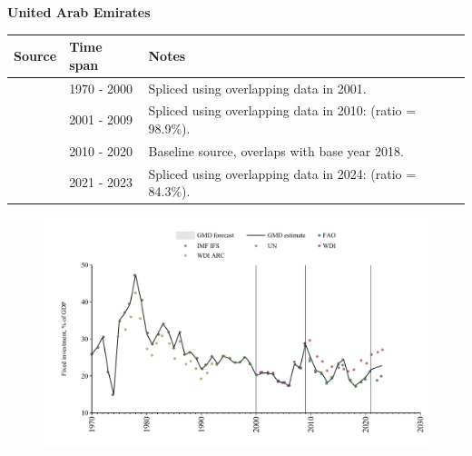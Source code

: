 \documentclass[12pt,a4paper,landscape]{article}
\begin{document}
\begin{adjustbox}{max totalsize={\paperwidth}{\paperheight},center}
\begin{minipage}[t][\textheight][t]{\textwidth}
\vspace*{0.5cm}
{}
\begin{center}
{\Large\bfseries United Arab Emirates}
\end{center}
\vspace{0.5cm}
\begin{table}[H]
\centering
\small
\begin{tabular}{|l|l|l|}
\hline
\textbf{Source} & \textbf{Time span} & \textbf{Notes} \\
\hline
\rowcolor{white}\cite{UN}& 1970 - 2000 &Spliced using overlapping data in 2001.\\
\rowcolor{lightgray}\cite{WDI}& 2001 - 2009 &Spliced using overlapping data in 2010: (ratio = 98.9\%).\\
\rowcolor{white}\cite{UN}& 2010 - 2020 &Baseline source, overlaps with base year 2018.\\
\rowcolor{lightgray}\cite{IMF_IFS}& 2021 - 2023 &Spliced using overlapping data in 2024: (ratio = 84.3\%).\\
\hline
\end{tabular}
\end{table}
\begin{figure}[H]
\centering
\includegraphics[width=\textwidth,height=0.6\textheight,keepaspectratio]{graphs/ARE_finv_GDP.pdf}
\end{figure}
\end{minipage}
\end{adjustbox}
\end{document}
